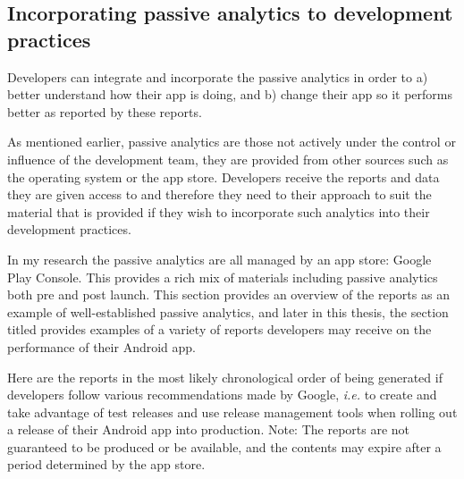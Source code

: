 \subsection{Incorporating passive analytics to development practices}
Developers can integrate and incorporate the passive analytics %
in order to a) better understand how their app is doing, and b) change their app so it performs better as reported by these reports.


As mentioned earlier, passive analytics are those not actively under the control or influence of the development team, they are provided from other sources such as the operating system or the app store. Developers receive the reports and data they are given access to and therefore they need to their approach to suit the material that is provided if they wish to incorporate such analytics into their development practices.

In my research the passive analytics are all managed by an app store: Google Play Console. 
This provides a rich mix of materials including passive analytics both pre and post launch. This section provides an overview of the reports as an example of well-established passive analytics, and later in this thesis, the section titled \href{google_play_console_section}{\emph{}} provides examples of a variety of reports developers may receive on the performance of their Android app.

Here are the reports in the most likely chronological order of being generated if developers follow various recommendations made by Google, \emph{i.e.} to create and take advantage of test releases and use release management tools when rolling out a release of their Android app into production. Note: The reports are not guaranteed to be produced or be available, and the contents may expire after a period determined by the app store.

